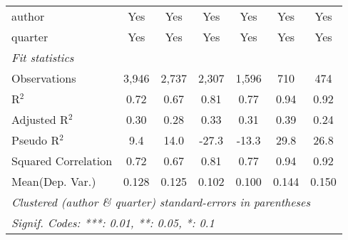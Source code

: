 \begin{tabular}{lcccccc}
   author                                                     & Yes          & Yes          & Yes           & Yes          & Yes            & Yes\\  
   quarter                                                    & Yes          & Yes          & Yes           & Yes          & Yes            & Yes\\  
   \midrule
   \emph{Fit statistics}\\
   Observations                                               & 3,946        & 2,737        & 2,307         & 1,596        & 710            & 474\\  
   R$^2$                                                      & 0.72         & 0.67         & 0.81          & 0.77         & 0.94           & 0.92\\  
   Adjusted R$^2$                                             & 0.30         & 0.28         & 0.33          & 0.31         & 0.39           & 0.24\\  
   Pseudo R$^2$                                               & 9.4          & 14.0         & -27.3         & -13.3        & 29.8           & 26.8\\  
   Squared Correlation                                        & 0.72         & 0.67         & 0.81          & 0.77         & 0.94           & 0.92\\  
Mean(Dep. Var.) & 0.128 & 0.125 & 0.102 & 0.100 & 0.144 & 0.150 \\
   \midrule \midrule
   \multicolumn{7}{l}{\emph{Clustered (author \& quarter) standard-errors in parentheses}}\\
   \multicolumn{7}{l}{\emph{Signif. Codes: ***: 0.01, **: 0.05, *: 0.1}}\\
\end{tabular}
\par\endgroup
